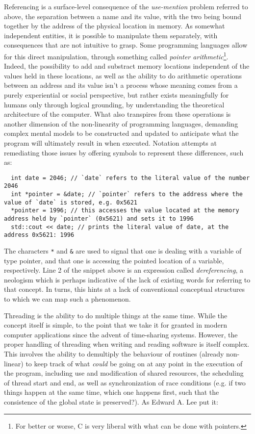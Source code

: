 \documentclass{article}
\begin{document}
Referencing is a surface-level consequence of the \emph{use-mention} problem referred to above, the separation between a name and its value, with the two being bound together by the address of the physical location in memory. As somewhat independent entities, it is possible to manipulate them separately, with consequences that are not intuitive to grasp. Some programming languages allow for this direct manipulation, through something called \emph{pointer arithmetic}\footnote{For better or worse, C is very liberal with what can be done with pointers.}. Indeed, the possibility to add and substract memory locations independent of the values held in these locations, as well as the ability to do arithmetic operations between an address and its value isn't a process whose meaning comes from a purely experiential or social perspective, but rather exists meaningfully for humans only through logical grounding, by understanding the theoretical architecture of the computer. What also transpires from these operations is another dimension of the non-linearity of programming languages, demanding complex mental models to be constructed and updated to anticipate what the program will ultimately result in when executed. Notation attempts at remediating those issues by offering symbols to represent these differences, such as:

\begin{lstlisting}
  int date = 2046; // `date` refers to the literal value of the number 2046
  int *pointer = &date; // `pointer` refers to the address where the value of `date` is stored, e.g. 0x5621
  *pointer = 1996; // this accesses the value located at the memory address held by `pointer` (0x5621) and sets it to 1996
  std::cout << date; // prints the literal value of date, at the address 0x5621: 1996
\end{lstlisting}

The characters \lstinline{*} and \lstinline{&} are used to signal that one is dealing with a variable of type pointer, and that one is accessing the pointed location of a variable, respectively. Line 2 of the snippet above is an expression called \emph{dereferencing}, a neologism which is perhaps indicative of the lack of existing words for referring to that concept. In turns, this hints at a lack of conventional conceptual structures to which we can map such a phenomenon.

Threading is the ability to do multiple things at the same time. While the concept itself is simple, to the point that we take it for granted in modern computer applications since the advent of time-sharing systems. However, the proper handling of threading when writing and reading software is itself complex. This involves the ability to demultiply the behaviour of routines (already non-linear) to keep track of what \emph{could} be going on at any point in the execution of the program, including use and modification of shared resources, the scheduling of thread start and end, as well as synchronization of race conditions (e.g. if two things happen at the same time, which one happens first, such that the consistence of the global state is preserved?). As Edward A. Lee put it:
\end{document}
